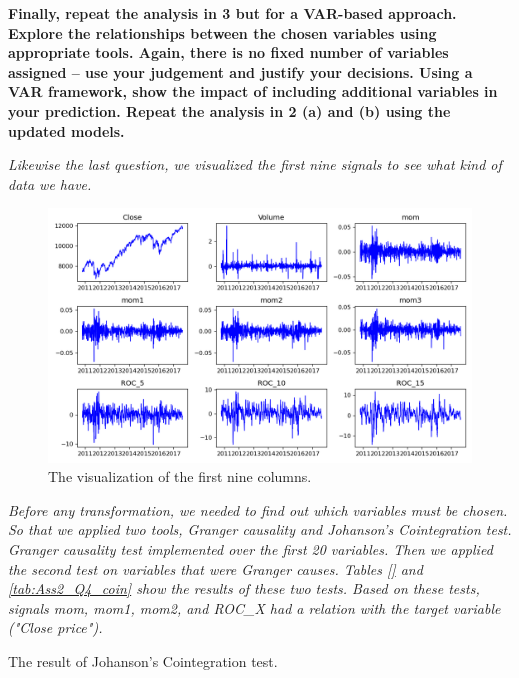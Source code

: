 \item \textbf{Finally, repeat the analysis in 3 but for a VAR-based approach. Explore the relationships between the chosen variables using appropriate tools. Again, there is no fixed number of variables assigned – use your judgement and justify your decisions.  Using a VAR framework, show the impact of including additional variables in your prediction. Repeat the analysis in 2 (a) and (b) using the updated models.} 

\textit{Likewise the last question, we visualized the first nine signals to see what kind of data we have.} 

\begin{figure}[H]
    \centering
    \begin{minipage}[b]{1\textwidth}
        \includegraphics[width=\textwidth]{figures/Ass2/Ass2_Q3_raw_signal.png}
    \end{minipage}
    \caption{The visualization of the first nine columns.}
    \label{fig:Ass2_Q4_raw_signal}
\end{figure}


\textit{Before any transformation, we needed to find out which variables must be chosen. So that we applied two tools, Granger causality and Johanson's Cointegration test. Granger causality test implemented over the first 20 variables. Then we applied the second test on variables that were Granger causes. Tables \ref{} and \ref{tab:Ass2_Q4_coin} show the results of these two tests.
Based on these tests, signals mom, mom1, mom2, and ROC\_X had a relation with the target variable ("Close price").}

\begin{table}[H]
\centering
\caption{The result of Johanson's Cointegration test.}
\label{tab:Ass2_Q4_coin}

\end{table}

